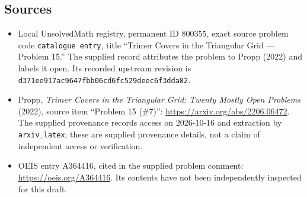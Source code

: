 \documentclass[11pt]{article}
\begin{document}
\subsection{Sources}
\begin{itemize}
\item Local UnsolvedMath registry, permanent ID \(800355\), exact source problem code \texttt{catalogue entry}, title ``Trimer Covers in the Triangular Grid --- Problem 15.'' The supplied record attributes the problem to Propp (2022) and labels it open. Its recorded upstream revision is \texttt{d371ee917ac9647fbb06cd6fc529deec6f3dda82}.
\item Propp, \emph{Trimer Covers in the Triangular Grid: Twenty Mostly Open Problems} (2022), source item ``Problem 15 (\#7)'': \url{https://arxiv.org/abs/2206.06472}. The supplied provenance records access on 2026-10-16 and extraction by \texttt{arxiv\_latex}; these are supplied provenance details, not a claim of independent access or verification.
\item OEIS entry A364416, cited in the supplied problem comment: \url{https://oeis.org/A364416}. Its contents have not been independently inspected for this draft.
\end{itemize}
\end{document}

